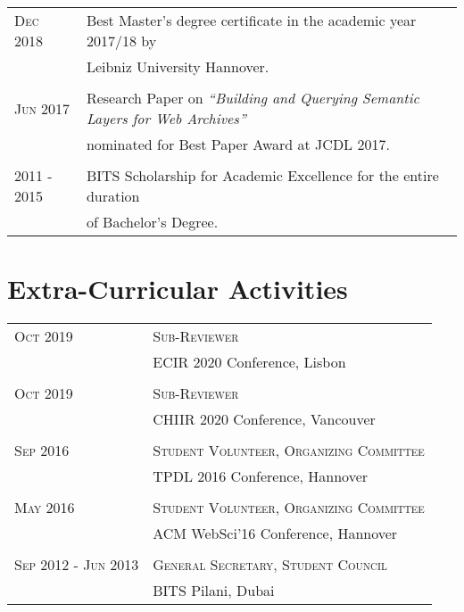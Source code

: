 \documentclass[a4paper,10pt]{article} %
\begin{document}
\begin{tabular}{ll}
\textsc{Dec} 2018 & Best Master's degree certificate in the academic year 2017/18 by\\
				  & Leibniz University Hannover.\\
\\
\textsc{Jun} 2017 & Research Paper on \emph{``Building and Querying Semantic Layers for Web Archives''}\\
& nominated for Best Paper Award at JCDL 2017.\\
\\
\textsc{2011 - 2015} & BITS Scholarship for Academic Excellence for the entire 
duration\\
& of Bachelor’s Degree.

\end{tabular}


\section{Extra-Curricular Activities}

\begin{tabular}{ll}
\textsc{Oct 2019} & \textsc{Sub-Reviewer}\\
& ECIR 2020 Conference, Lisbon\\
\\
\textsc{Oct 2019} & \textsc{Sub-Reviewer}\\
& CHIIR 2020 Conference, Vancouver\\
\\
\textsc{Sep 2016} & \textsc{Student Volunteer, Organizing Committee}\\
& TPDL 2016 Conference, Hannover\\
\\
\textsc{May 2016} & \textsc{Student Volunteer, Organizing Committee}\\
& ACM WebSci'16 Conference, Hannover\\
\\
\textsc{Sep 2012 - Jun 2013} & \textsc{General Secretary, Student Council}\\
& BITS Pilani, Dubai\\
\end{tabular}

\end{document}
